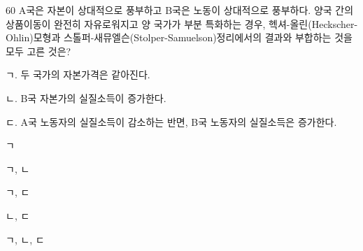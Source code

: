 \begin{question}{60}
A국은 자본이 상대적으로 풍부하고 B국은 노동이 상대적으로 풍부하다. 양국 간의 상품이동이 완전히 자유로워지고 양 국가가 부분 특화하는 경우, 헥셔-올린(Heckscher-Ohlin)모형과 스톨퍼-새뮤엘슨(Stolper-Samuelson)정리에서의 결과와 부합하는 것을 모두 고른 것은?
\begin{framedtext}
ㄱ. 두 국가의 자본가격은 같아진다. \par
ㄴ. B국 자본가의 실질소득이 증가한다. \par
ㄷ. A국 노동자의 실질소득이 감소하는 반면, B국 노동자의 실질소득은 증가한다.
\end{framedtext}
\begin{choices}
  \item ㄱ
  \item ㄱ, ㄴ
  \item ㄱ, ㄷ
  \item ㄴ, ㄷ
  \item ㄱ, ㄴ, ㄷ
\end{choices}
\end{question}
